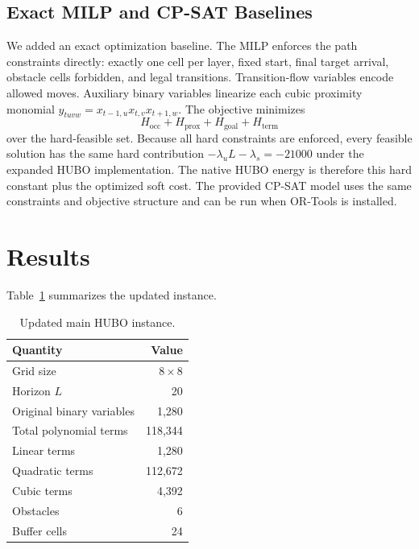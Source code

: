 \documentclass[10pt,conference]{IEEEtran}
\begin{document}
\subsection{Exact MILP and CP-SAT Baselines}
We added an exact optimization baseline. The MILP enforces the path constraints directly: exactly one cell per layer, fixed start, final target arrival, obstacle cells forbidden, and legal transitions. Transition-flow variables encode allowed moves. Auxiliary binary variables linearize each cubic proximity monomial $y_{tuvw}=x_{t-1,u}x_{t,v}x_{t+1,w}$. The objective minimizes
\begin{equation}
H_{\mathrm{occ}}+H_{\mathrm{prox}}+H_{\mathrm{goal}}+H_{\mathrm{term}}
\end{equation}
over the hard-feasible set. Because all hard constraints are enforced, every feasible solution has the same hard contribution $-\lambda_u L-\lambda_s=-21000$ under the expanded HUBO implementation. The native HUBO energy is therefore this hard constant plus the optimized soft cost. The provided CP-SAT model uses the same constraints and objective structure and can be run when OR-Tools is installed.

\section{Results}
Table~\ref{tab:instance} summarizes the updated instance.
\begin{table}[t]
\caption{Updated main HUBO instance.}
\label{tab:instance}
\centering
\begin{tabular}{lr}
\toprule
Quantity & Value\\
\midrule
Grid size & $8\times 8$\\
Horizon $L$ & 20\\
Original binary variables & 1,280\\
Total polynomial terms & 118,344\\
Linear terms & 1,280\\
Quadratic terms & 112,672\\
Cubic terms & 4,392\\
Obstacles & 6\\
Buffer cells & 24\\
\bottomrule
\end{tabular}
\end{table}
\end{document}

